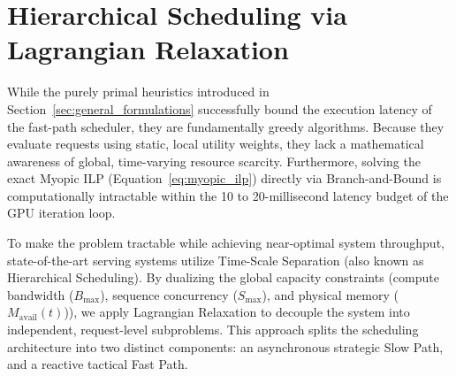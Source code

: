 \documentclass[11pt]{article}
\begin{document}
\section{Hierarchical Scheduling via Lagrangian Relaxation}
\label{sec:hierarchical_scheduling}

While the purely primal heuristics introduced in Section~\ref{sec:general_formulations} successfully bound the execution latency of the fast-path scheduler, they are fundamentally greedy algorithms. Because they evaluate requests using static, local utility weights, they lack a mathematical awareness of global, time-varying resource scarcity. Furthermore, solving the exact Myopic ILP (Equation~\ref{eq:myopic_ilp}) directly via Branch-and-Bound is computationally intractable within the 10 to 20-millisecond latency budget of the GPU iteration loop.

To make the problem tractable while achieving near-optimal system throughput, state-of-the-art serving systems utilize Time-Scale Separation (also known as Hierarchical Scheduling). By dualizing the global capacity constraints (compute bandwidth ($B_{\max}$), sequence concurrency ($S_{\max}$), and physical memory ($M_{\mathrm{avail}}(t)$)), we apply Lagrangian Relaxation to decouple the system into independent, request-level subproblems. This approach splits the scheduling architecture into two distinct components: an asynchronous strategic Slow Path, and a reactive tactical Fast Path.



\end{document}
